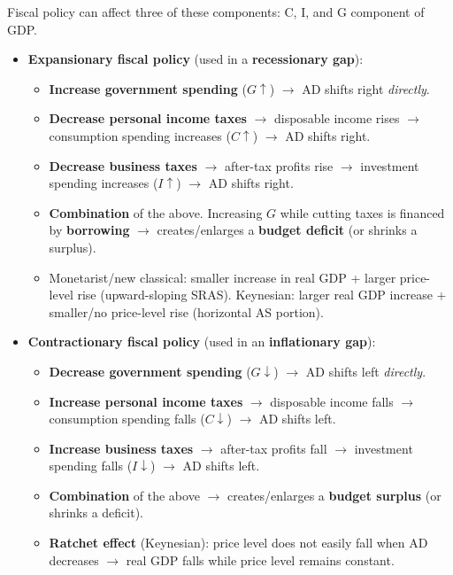 \documentclass[a4paper,12pt]{article}
\begin{document}
Fiscal policy can affect three of these components: C, I, and G component of GDP.
\begin{itemize}
  \item \textbf{Expansionary fiscal policy} (used in a \textbf{recessionary gap}):
  \begin{itemize}
    \item \textbf{Increase government spending} ($G \uparrow$) $\to$ AD shifts right \textit{directly}.
    \item \textbf{Decrease personal income taxes} $\to$ disposable income rises $\to$ consumption spending increases ($C \uparrow$) $\to$ AD shifts right.
    \item \textbf{Decrease business taxes} $\to$ after-tax profits rise $\to$ investment spending increases ($I \uparrow$) $\to$ AD shifts right.
    \item \textbf{Combination} of the above. Increasing $G$ while cutting taxes is financed by \textbf{borrowing} $\to$ creates/enlarges a \textbf{budget deficit} (or shrinks a surplus).
    \item Monetarist/new classical: smaller increase in real GDP + larger price-level rise (upward-sloping SRAS). Keynesian: larger real GDP increase + smaller/no price-level rise (horizontal AS portion).
  \end{itemize}
  \item \textbf{Contractionary fiscal policy} (used in an \textbf{inflationary gap}):
  \begin{itemize}
    \item \textbf{Decrease government spending} ($G \downarrow$) $\to$ AD shifts left \textit{directly}.
    \item \textbf{Increase personal income taxes} $\to$ disposable income falls $\to$ consumption spending falls ($C \downarrow$) $\to$ AD shifts left.
    \item \textbf{Increase business taxes} $\to$ after-tax profits fall $\to$ investment spending falls ($I \downarrow$) $\to$ AD shifts left.
    \item \textbf{Combination} of the above $\to$ creates/enlarges a \textbf{budget surplus} (or shrinks a deficit).
    \item \textbf{Ratchet effect} (Keynesian): price level does not easily fall when AD decreases $\to$ real GDP falls while price level remains constant.
  \end{itemize}
\end{itemize}
\end{document}

